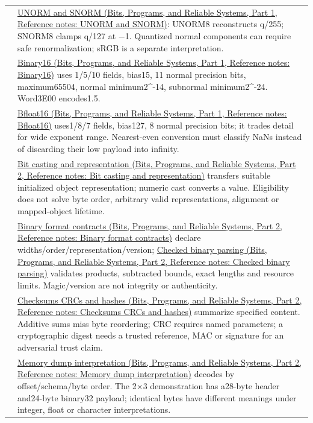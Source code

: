 {\begin{longtable}[]{@{}
  >{\raggedright\arraybackslash}p{}
  >{\raggedright\arraybackslash}p{}@{}}
94 & \href{../01-Bits-Programs-and-Reliable-Systems-P01/main.pdf\#appendix-b2402c453dac}{UNORM and SNORM (Bits, Programs, and Reliable Systems, Part 1, Reference notes: UNORM and SNORM)}: UNORM8 reconstructs q/255; SNORM8 clamps q/127 at −1. Quantized normal components can require safe renormalization; sRGB is a separate interpretation. \\
95 & \href{../01-Bits-Programs-and-Reliable-Systems-P01/main.pdf\#appendix-34443cec7170}{Binary16 (Bits, Programs, and Reliable Systems, Part 1, Reference notes: Binary16)} uses 1/5/10 fields, bias15, 11 normal precision bits, maximum65504, normal minimum2\^{}-14, subnormal minimum2\^{}-24. Word3E00 encodes1.5. \\
96 & \href{../01-Bits-Programs-and-Reliable-Systems-P01/main.pdf\#appendix-18b8dd966b5d}{Bfloat16 (Bits, Programs, and Reliable Systems, Part 1, Reference notes: Bfloat16)} uses1/8/7 fields, bias127, 8 normal precision bits; it trades detail for wide exponent range. Nearest-even conversion must classify NaNs instead of discarding their low payload into infinity. \\
97 & \href{../01-Bits-Programs-and-Reliable-Systems-P02/main.pdf\#appendix-34ee45f161c1}{Bit casting and representation (Bits, Programs, and Reliable Systems, Part 2, Reference notes: Bit casting and representation)} transfers suitable initialized object representation; numeric cast converts a value. Eligibility does not solve byte order, arbitrary valid representations, alignment or mapped-object lifetime. \\
98 & \href{../01-Bits-Programs-and-Reliable-Systems-P02/main.pdf\#appendix-590bbb2424c1}{Binary format contracts (Bits, Programs, and Reliable Systems, Part 2, Reference notes: Binary format contracts)} declare widths/order/representation/version; \href{../01-Bits-Programs-and-Reliable-Systems-P02/main.pdf\#appendix-652d81568de9}{Checked binary parsing (Bits, Programs, and Reliable Systems, Part 2, Reference notes: Checked binary parsing)} validates products, subtracted bounds, exact lengths and resource limits. Magic/version are not integrity or authenticity. \\
99 & \href{../01-Bits-Programs-and-Reliable-Systems-P02/main.pdf\#appendix-ed338677de0a}{Checksums CRCs and hashes (Bits, Programs, and Reliable Systems, Part 2, Reference notes: Checksums CRCs and hashes)} summarize specified content. Additive sums miss byte reordering; CRC requires named parameters; a cryptographic digest needs a trusted reference, MAC or signature for an adversarial trust claim. \\
100 & \href{../01-Bits-Programs-and-Reliable-Systems-P02/main.pdf\#appendix-230b59c0676b}{Memory dump interpretation (Bits, Programs, and Reliable Systems, Part 2, Reference notes: Memory dump interpretation)} decodes by offset/schema/byte order. The 2×3 demonstration has a28-byte header and24-byte binary32 payload; identical bytes have different meanings under integer, float or character interpretations. \\
\end{longtable}
}

